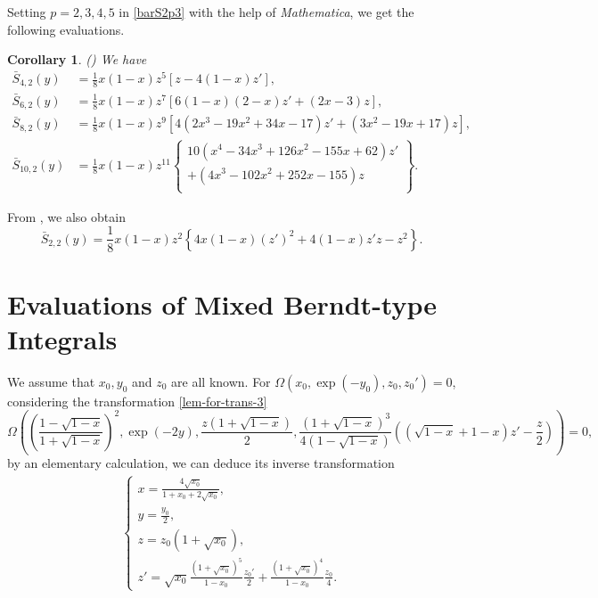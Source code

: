 \documentclass[11pt]{article}
\let\oldsection\section
\renewcommand\section{\setcounter{equation}{0}\oldsection}
\theoremstyle{plain}
\newtheorem{cor}[thm]{Corollary}
\theoremstyle{definition}
\begin{document}
Setting $p=2,3,4,5$ in \eqref{barS2p3} with the help of \emph{Mathematica}, we get the following evaluations.
\begin{cor}\emph{(\cite[Cor.1]{XuZhao-2024})} We have
\begin{align*}
\bar{S}_{4,2}(y)&=\frac{1}{8}x(1 - x)z^{5}[z - 4(1 - x)z'],\\
\bar{S}_{6,2}(y)&=\frac{1}{8}x(1 - x)z^{7}[6(1 - x)(2 - x)z'+(2x - 3)z],\\
\bar{S}_{8,2}(y)&=\frac{1}{8}x(1 - x)z^{9}[4(2x^{3}-19x^{2}+34x - 17)z'+(3x^{2}-19x + 17)z],\\
\bar{S}_{10,2}(y)&=\frac{1}{8}x(1-x)z^{11}\left\{ \begin{array}{c}
10(x^4-34x^3+126x^2-155x+62)z'\\
+(4x^3-102x^2+252x-155)z\\
\end{array} \right\} .
\end{align*}
\end{cor}
From \cite[Cor.1]{XuZhao-2024}, we also obtain
$$\bar{S}_{2,2}(y)=\frac{1}{8}x(1-x)z^2\left\{ 4x(1-x)\left( z' \right) ^2+4\left( 1-x \right) z'z-z^2 \right\}.$$

\section{Evaluations of Mixed Berndt-type Integrals}
We assume that $x_0, y_0$ and $z_0$ are all known. For $\Omega \left( x_0,\exp \left( -y_0 \right) ,z_0,z_0' \right) =0$, considering the transformation \eqref{lem-for-trans-3}
$$
\Omega \left( \left( \frac{1-\sqrt{1-x}}{1+\sqrt{1-x}} \right) ^2,\exp \left( -2y \right) ,\frac{z\left( 1+\sqrt{1-x} \right)}{2},\frac{\left( 1+\sqrt{1-x} \right) ^3}{4\left( 1-\sqrt{1-x} \right)}\left( \left( \sqrt{1-x}+1-x \right) z'-\frac{z}{2} \right) \right) =0,
$$
by an elementary calculation, we can deduce its inverse transformation
\begin{align}\label{trsform}
\begin{cases}
x=\frac{4\sqrt{x_0}}{1+x_0+2\sqrt{x_0}},\\
y=\frac{y_0}{2},\\
z=z_0\left( 1+\sqrt{x_0} \right) ,\\
z'=\sqrt{x_0}\frac{\left( 1+\sqrt{x_0} \right) ^5}{1-x_0}\frac{z_0'}{2}+\frac{\left( 1+\sqrt{x_0} \right) ^4}{1-x_0}\frac{z_0}{4}.
\end{cases}
\end{align}
\end{document}
